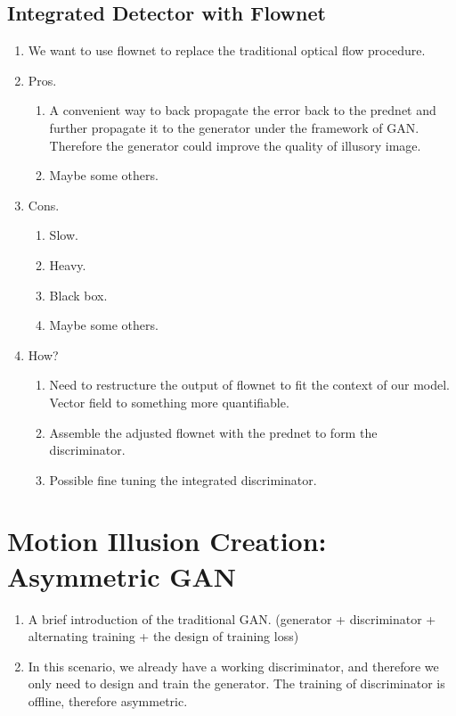 \documentclass[journal]{IEEEtran}
\begin{document}
\subsection{Integrated Detector with Flownet}
\label{sec:detection_idf}
\begin{enumerate}
  \item We want to use flownet to replace the traditional optical flow procedure.
  \item Pros. \begin{enumerate}
    \item A convenient way to back propagate the error back to the prednet and further propagate it to the generator under the framework of GAN. Therefore the generator could improve the quality of illusory image.
    \item Maybe some others.
  \end{enumerate}
  \item Cons. \begin{enumerate}
    \item Slow.
    \item Heavy.
    \item Black box.
    \item Maybe some others.
  \end{enumerate}
  \item How? \begin{enumerate}
    \item Need to restructure the output of flownet to fit the context of our model. Vector field to something more quantifiable.
    \item Assemble the adjusted flownet with the prednet to form the discriminator.
    \item Possible fine tuning the integrated discriminator.
  \end{enumerate}
\end{enumerate}

\section{Motion Illusion Creation: Asymmetric GAN}
\label{sec:generation}
\begin{enumerate}
  \item A brief introduction of the traditional GAN. (generator + discriminator + alternating training + the design of training loss)
  \item In this scenario, we already have a working discriminator, and therefore we only need to design and train the generator. The training of discriminator is offline, therefore asymmetric.
\end{enumerate}
\end{document}
